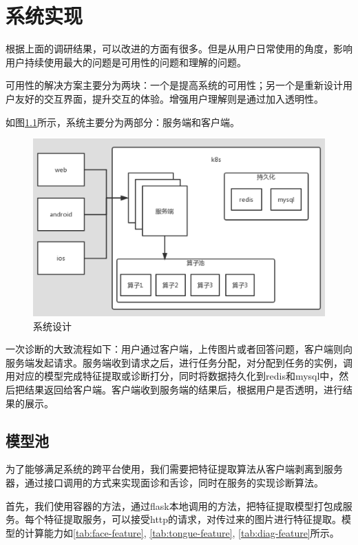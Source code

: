 \chapter{系统实现}
根据上面的调研结果，可以改进的方面有很多。但是从用户日常使用的角度，影响用户持续使用最大的问题是可用性的问题和理解的问题。

可用性的解决方案主要分为两块：一个是提高系统的可用性；另一个是重新设计用户友好的交互界面，提升交互的体验。增强用户理解则是通过加入透明性。

如图\ref{fig:system}所示，系统主要分为两部分：服务端和客户端。

\begin{figure}[ht]
    \centering
    \includegraphics[width=12cm]{images/system.png}
    \caption{系统设计}
    \label{fig:system}
\end{figure}

一次诊断的大致流程如下：用户通过客户端，上传图片或者回答问题，客户端则向服务端发起请求。服务端收到请求之后，进行任务分配，对分配到任务的实例，调用对应的模型完成特征提取或诊断打分，同时将数据持久化到redis和mysql中，然后把结果返回给客户端。客户端收到服务端的结果后，根据用户是否透明，进行结果的展示。

\section{模型池}

为了能够满足系统的跨平台使用，我们需要把特征提取算法从客户端剥离到服务器，通过接口调用的方式来实现面诊和舌诊，同时在服务的实现诊断算法。

首先，我们使用容器的方法，通过flask本地调用的方法，把特征提取模型打包成服务。每个特征提取服务，可以接受http的请求，对传过来的图片进行特征提取。模型的计算能力如\ref{tab:face-feature}, \ref{tab:tongue-feature}, \ref{tab:diag-feature}所示。

